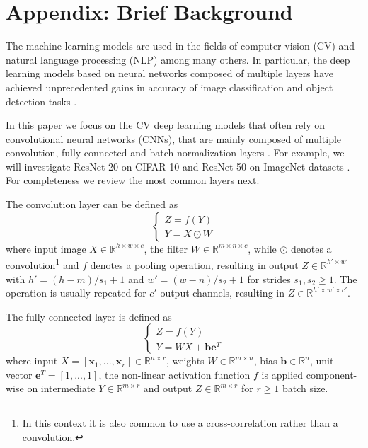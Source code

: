\documentclass{article}
\begin{document}
\section{Appendix: Brief Background}

The machine learning models are used in the fields of computer vision (CV) and natural language processing (NLP) among many others. In particular, the deep learning models based on neural networks composed of multiple layers have achieved unprecedented gains in accuracy of image classification and object detection tasks \cite{Krizhevsky2012,Szegedy2014,MNIST,CIFAR,ImageNet}. 

In this paper we focus on the CV deep learning models that often rely on convolutional neural networks (CNNs), that are mainly composed of multiple convolution, fully connected and batch normalization layers \cite{LeNet1989a,LeNet1989d,Goodfellow2016,Ioffe2015}. For example, we will investigate ResNet-20 on CIFAR-10 and ResNet-50 on ImageNet datasets \cite{ResNet,CIFAR,ImageNet}. For completeness we review the most common layers next.

The convolution layer can be defined as 
\begin{equation}
\left\{
\begin{array}{l}
Z = f(Y) \\
Y = X \odot W
\end{array}
\right.
\label{eq:convolution}
\end{equation}
where input image $X \in \mathbb{R}^{h \times w \times c}$, the filter $W \in \mathbb{R}^{m \times n \times c}$, while $\odot$ denotes a convolution\footnote{In this context it is also common to use a cross-correlation rather than a convolution.} and $f$ denotes a pooling operation, resulting in output $Z \in \mathbb{R}^{h' \times w'}$ with $h'=(h-m)/s_1+1$ and $w'=(w-n)/s_2+1$ for strides $s_1,s_2 \ge 1$. The operation is usually repeated for $c'$ output channels, resulting in $Z \in \mathbb{R}^{h' \times w' \times c'}$.  

The fully connected layer is defined as
\begin{equation}
\left\{
\begin{array}{l}
Z = f(Y) \\
Y = WX + \textbf{b}\textbf{e}^{T}
\end{array}
\right.
\label{eq:fully_connected}
\end{equation}
where input $X = [\textbf{x}_1,...,\textbf{x}_r] \in \mathbb{R}^{n \times r}$, weights $W \in \mathbb{R}^{m \times n}$, bias $\textbf{b} \in \mathbb{R}^n$, unit vector $\textbf{e}^{T}=[1,...,1]$, the non-linear activation function $f$ is applied component-wise on intermediate $Y \in \mathbb{R}^{m \times r}$ and output $Z\in \mathbb{R}^{m \times r}$ for $r \ge 1$ batch size. 
\end{document}
